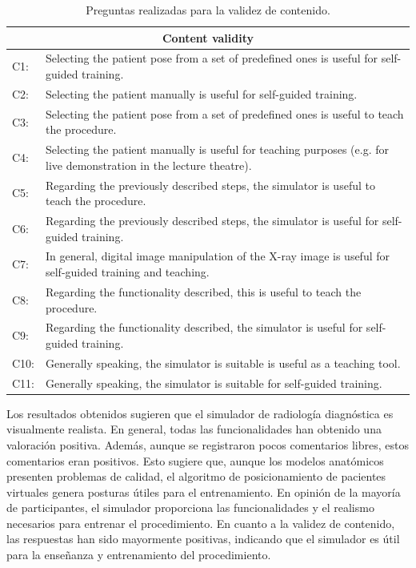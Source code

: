 \begin{table}[ht]
    \centering
    \begin{tabular}{lp{14cm}}
    \hline
    \multicolumn{2}{c}{Content validity }
    \\
    \hline
    C1:     &  Selecting the patient pose from a set of predefined ones is useful for self-guided training.  \\
    C2:     & Selecting the patient manually is useful for self-guided training.   \\
    C3:     & Selecting the patient pose from a set of predefined ones is useful to teach the procedure.   \\
    C4:     & Selecting the patient manually is useful for teaching purposes (e.g. for live demonstration in the lecture theatre).    \\
    C5:     &  Regarding the previously described steps, the simulator is useful to teach the procedure.  \\
    C6:     & Regarding the previously described steps, the simulator is useful for self-guided training.  \\
    C7:     & In general, digital image manipulation of the X-ray image is useful for self-guided training and teaching.  \\
    C8:     & Regarding the functionality described, this is useful to teach the procedure.   \\
    C9:     & Regarding the functionality described, the simulator is useful  for self-guided training.  \\
    C10:     & Generally speaking, the simulator is suitable is useful as a teaching tool.   \\
    C11:     & Generally speaking, the simulator is suitable for self-guided training.   \\
    \hline
    \end{tabular}
    \caption{Preguntas realizadas para la validez de contenido.}
    \label{tab:contentvalidity}
\end{table}

Los resultados obtenidos sugieren que el simulador de radiología diagnóstica es visualmente realista. En general, todas las funcionalidades han obtenido una valoración positiva. Además, aunque se registraron pocos comentarios libres, estos comentarios eran positivos. Esto sugiere que, aunque los modelos anatómicos presenten problemas de calidad, el algoritmo de posicionamiento de pacientes virtuales genera posturas útiles para el entrenamiento. En opinión de la mayoría de participantes, el simulador proporciona las funcionalidades y el realismo necesarios para entrenar el procedimiento. En cuanto a la validez de contenido, las respuestas han sido mayormente positivas, indicando que el simulador es útil para la enseñanza y entrenamiento del procedimiento. 


